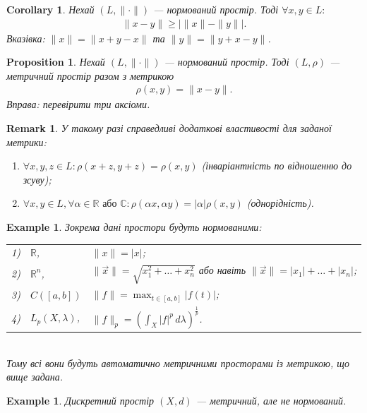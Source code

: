 \documentclass[a4paper, 10pt]{article}
\theoremstyle{theoremdd}
\theoremstyle{theoremdd}
\theoremstyle{theoremdd}
\theoremstyle{theoremdd}
\newtheorem{example}[theorem]{Example}
\theoremstyle{theoremdd}
\newtheorem{proposition}[theorem]{Proposition}
\theoremstyle{theoremdd}
\newtheorem{remark}[theorem]{Remark}
\theoremstyle{theoremdd}
\theoremstyle{theoremdd}
\newtheorem{corollary}[theorem]{Corollary}
\begin{document}
\begin{corollary}
Нехай $(L, \| \cdot \|)$ --- нормований простір. Тоді $\forall x,y \in L:$
\begin{align*}
\|x-y\| \geq \left| \|x\| - \|y\| \right|.
\end{align*}
\textit{Вказівка: $\|x\| = \|x + y - x\|$ та $\|y\| = \|y + x -y \|$.}
\end{corollary}

\begin{proposition}
Нехай $(L, \| \cdot \|)$ --- нормований простір. Тоді $(L,\rho)$ --- метричний простір разом з метрикою
\begin{align*}
\rho(x,y) = \|x-y\|.
\end{align*}
\textit{Вправа: перевірити три аксіоми.}
\end{proposition}

\begin{remark}
У такому разі справедливі додаткові властивості для заданої метрики:
\begin{enumerate}[nosep,wide=0pt,label={\arabic*)}]
\item $\forall x,y,z \in L: \rho(x+z,y+z) = \rho(x,y)$ (\textit{інваріантність по відношенню до зсуву});
\item $\forall x,y \in L, \forall \alpha \in \mathbb{R} \text{ або } \mathbb{C}: \rho(\alpha x, \alpha y) = |\alpha| \rho(x,y)$ (\textit{однорідність}).
\end{enumerate}
\end{remark}

\begin{example}
Зокрема дані простори будуть нормованими:\\
\begin{tabular}{rll}
1) & $\mathbb{R}$, & $\| x\| = |x|$;\\
2) & $\mathbb{R}^n$, & $\| \vec{x} \| = \sqrt{x_1^2 + \dots + x_n^2}$ або навіть $\| \vec{x} \| = |x_1| + \dots + |x_n|$;\\
3) & $C([a,b])$ & $\displaystyle \| f\| = \max_{t \in [a,b]} |f(t)|$;\\
4) & $L_p(X,\lambda)$, & $\|f\|_p = \displaystyle\left(\int_X |f|^p\,d\lambda\right)^{\frac{1}{p}}$.
\end{tabular}\\
Тому всі вони будуть автоматично метричними просторами із метрикою, що вище задана.
\end{example}

\begin{example}
Дискретний простір $(X,d)$ --- метричний, але не нормований.
\end{example}
\end{document}
